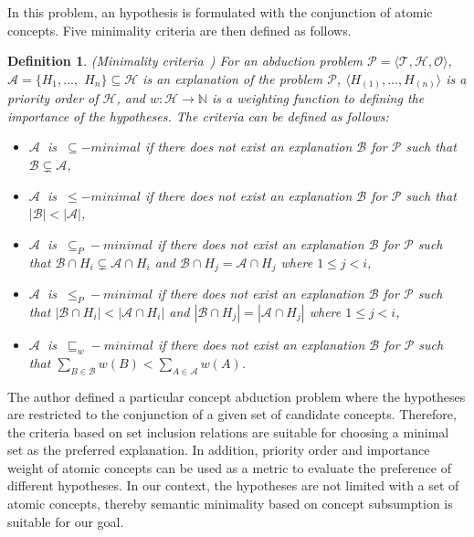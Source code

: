 \documentclass{article}
\newtheorem{mydef}{Definition}
\newcommand\abs[1]{\left\lvert #1 \right\rvert}
\begin{document}
In this problem, an hypothesis is formulated with the conjunction of atomic concepts.
Five minimality criteria are then defined as follows.
\begin{mydef}{(Minimality criteria~\cite{bienvenu08complexity})}
For an abduction problem $\mathcal{P}=\langle \mathcal{T},\mathcal{H}, \mathcal{O}\rangle$, $\mathcal{A}=\{H_1,\dots,$ $H_n \} \subseteq \mathcal{H}$ is an explanation of the problem $\mathcal{P}$,
$\langle H_{(1)},\dots,H_{(n)}\rangle$ is a priority order of  $\mathcal{H}$,
and $w:\mathcal{H}\rightarrow \mathbb{N}$ is a weighting function to defining the importance of the hypotheses. The criteria can be defined as follows:
\begin{itemize}
\item  $\mathcal{A}~$ is  $~\subseteq -minimal$ if there does not exist an explanation $\mathcal{B}$ for $\mathcal{P}$ such that $\mathcal{B} \subsetneq \mathcal{A}$,
\item  $\mathcal{A}~$ is  $~\leq -minimal$ if there does not exist an explanation $\mathcal{B}$ for $\mathcal{P}$ such that $\abs{\mathcal{B}} < \abs{\mathcal{A}}$,
\item  $\mathcal{A}~$ is  $~\subseteq_P -minimal$ if there does not exist an explanation $\mathcal{B}$ for $\mathcal{P}$ such that $\mathcal{B} \cap H_i \subsetneq \mathcal{A}\cap H_i$ and
$\mathcal{B} \cap H_j = \mathcal{A}\cap H_j$ where $1\leq j< i$,
\item  $\mathcal{A}~$ is  $~\leq_P -minimal$ if there does not exist an explanation $\mathcal{B}$ for $\mathcal{P}$ such that $\abs{\mathcal{B} \cap H_i} < \abs{\mathcal{A}\cap H_i}$ and
$\abs{\mathcal{B} \cap H_j} = \abs{\mathcal{A}\cap H_j}$ where $1\leq j< i$,
\item  $\mathcal{A}~$ is  $~\sqsubseteq_w -minimal$ if there does not exist an explanation $\mathcal{B}$ for $\mathcal{P}$ such that $\sum_{B \in \mathcal{B}}w(B) < \sum_{A \in \mathcal{A}}w(A)$.
\end{itemize}
\label{def:minimality}
 \end{mydef}
 The author defined a particular concept abduction problem where the hypotheses are restricted to the conjunction of a given set of candidate concepts.
 Therefore, the criteria based on set inclusion relations are suitable for choosing a minimal set as the preferred explanation. 
 In addition, priority order and importance weight of atomic concepts can be used as a metric to evaluate the preference of different hypotheses.
 In our context, the hypotheses are not limited with a set of atomic concepts, thereby semantic minimality based on concept subsumption is suitable for our goal.
\end{document}
